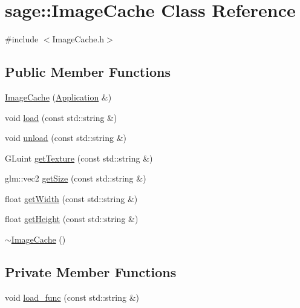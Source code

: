 \hypertarget{classsage_1_1ImageCache}{}\section{sage\+::Image\+Cache Class Reference}
\label{classsage_1_1ImageCache}


{\ttfamily \#include $<$Image\+Cache.\+h$>$}

\subsection*{Public Member Functions}
\begin{DoxyCompactItemize}
\item 
\mbox{\hyperlink{classsage_1_1ImageCache_abad3c395b2baa07ce3763a593d253ee4}{Image\+Cache}} (\mbox{\hyperlink{classsage_1_1Application}{Application}} \&)
\item 
void \mbox{\hyperlink{classsage_1_1ImageCache_a8dd56015ff31706f4fedc3d3b85510f4}{load}} (const std\+::string \&)
\item 
void \mbox{\hyperlink{classsage_1_1ImageCache_ad97bd335815c57c59af1c9e5d5a2d9db}{unload}} (const std\+::string \&)
\item 
G\+Luint \mbox{\hyperlink{classsage_1_1ImageCache_a36611ddea849d743f31ad68972946002}{get\+Texture}} (const std\+::string \&)
\item 
glm\+::vec2 \mbox{\hyperlink{classsage_1_1ImageCache_ac81e10d00d95b6d5acdffad8b54bff09}{get\+Size}} (const std\+::string \&)
\item 
float \mbox{\hyperlink{classsage_1_1ImageCache_a62e8ffd461f65df1b8e990dd016e6fe4}{get\+Width}} (const std\+::string \&)
\item 
float \mbox{\hyperlink{classsage_1_1ImageCache_ab3fbe32a2cc379e05fb53a9883e20401}{get\+Height}} (const std\+::string \&)
\item 
\mbox{\hyperlink{classsage_1_1ImageCache_a48e8f9fc5513ee195d209cbec596c093}{$\sim$\+Image\+Cache}} ()
\end{DoxyCompactItemize}
\subsection*{Private Member Functions}
\begin{DoxyCompactItemize}
\item 
void \mbox{\hyperlink{classsage_1_1ImageCache_ae7bd4b346cfe144cc720c6a8457a741f}{load\+\_\+func}} (const std\+::string \&)
\end{DoxyCompactItemize}
